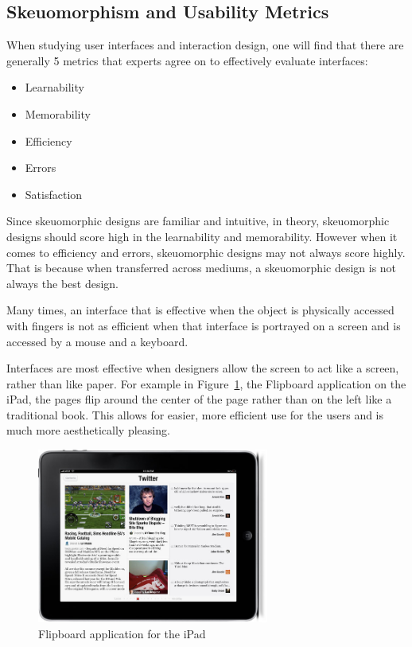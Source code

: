 \documentclass{article}
\begin{document}
\subsection{Skeuomorphism and Usability Metrics}
	When studying user interfaces and interaction design, one will find that there are generally 5 metrics that experts agree on to effectively evaluate interfaces: 
\begin{itemize}
\item Learnability 
\item Memorability 
\item Efficiency 
\item Errors 
\item Satisfaction 
\end{itemize}

	Since skeuomorphic designs are familiar and intuitive, in theory, skeuomorphic designs should score high in the learnability and memorability. However when it comes to efficiency and errors, skeuomorphic designs may not always score highly. That is because when transferred across mediums, a skeuomorphic design is not always the best design. 
	\begin{emph}Many times, an interface that is effective when the object is physically accessed with fingers is not as efficient when that interface is portrayed on a screen and is accessed by a mouse and a keyboard. 
	\end{emph}
	
	Interfaces are most effective when designers allow the screen to act like a screen, rather than like paper. For example in Figure~\ref{Flipboard}, the Flipboard application on the iPad, the pages flip around the center of the page rather than on the left like a traditional book. This allows for easier, more efficient use for the users and is much more aesthetically pleasing.~\cite{wired}
\begin{figure}
\centering
\includegraphics[width=3in]{flipboard.jpeg} 

\caption{Flipboard application for the iPad}
\label{Flipboard}
\end{figure}
\end{document}
